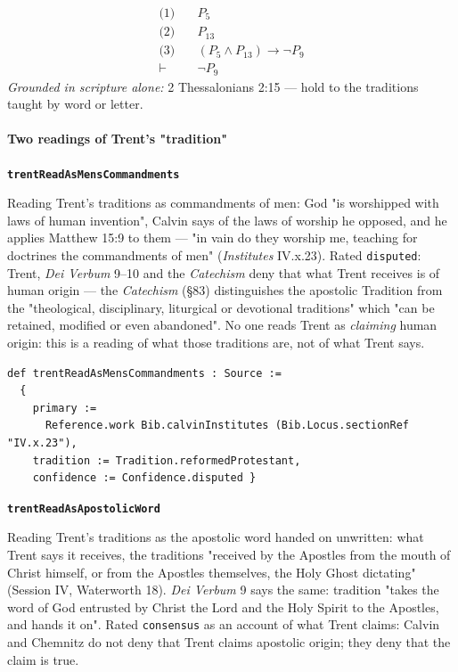 \documentclass[11pt]{article}
\begin{document}
\begin{align*}
  \text{(1)} \quad & P_{5} \\
  \text{(2)} \quad & P_{13} \\
  \text{(3)} \quad & (P_{5} \land P_{13}) \rightarrow \lnot P_{9} \\
  \vdash \quad & \lnot P_{9}
\end{align*}
\emph{Grounded in scripture alone:} 2 Thessalonians 2:15 — hold to the traditions taught by word or letter.
\paragraph*{Two readings of Trent's "tradition"}
\leavevmode\par
\par\medskip\noindent\textbf{\texttt{trent\allowbreak{}Read\allowbreak{}As\allowbreak{}Mens\allowbreak{}Commandments}}\par\nobreak\noindent
Reading Trent's traditions as commandments of men: God "is worshipped with laws of human invention", Calvin says of the laws of worship he opposed, and he applies Matthew 15:9 to them — "in vain do they worship me, teaching for doctrines the commandments of men" (\emph{Institutes} IV.x.23). Rated \texttt{disputed}: Trent, \emph{Dei Verbum} 9–10 and the \emph{Catechism} deny that what Trent receives is of human origin — the \emph{Catechism} (§83) distinguishes the apostolic Tradition from the "theological, disciplinary, liturgical or devotional traditions" which "can be retained, modified or even abandoned". No one reads Trent as \emph{claiming} human origin: this is a reading of what those traditions are, not of what Trent says.

{\small\begin{verbatim}
def trentReadAsMensCommandments : Source :=
  {
    primary :=
      Reference.work Bib.calvinInstitutes (Bib.Locus.sectionRef "IV.x.23"),
    tradition := Tradition.reformedProtestant,
    confidence := Confidence.disputed }
\end{verbatim}}
\par\medskip\noindent\textbf{\texttt{trent\allowbreak{}Read\allowbreak{}As\allowbreak{}Apostolic\allowbreak{}Word}}\par\nobreak\noindent
Reading Trent's traditions as the apostolic word handed on unwritten: what Trent says it receives, the traditions "received by the Apostles from the mouth of Christ himself, or from the Apostles themselves, the Holy Ghost dictating" (Session IV, Waterworth 18). \emph{Dei Verbum} 9 says the same: tradition "takes the word of God entrusted by Christ the Lord and the Holy Spirit to the Apostles, and hands it on". Rated \texttt{consensus} as an account of what Trent claims: Calvin and Chemnitz do not deny that Trent claims apostolic origin; they deny that the claim is true.
\end{document}
